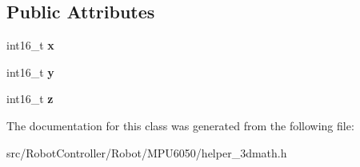 \subsection*{Public Attributes}
\begin{DoxyCompactItemize}
\item 
\hypertarget{class_vector_int16_a648435b4c99e9da9c95549ac344beaec}{int16\+\_\+t {\bfseries x}}\label{class_vector_int16_a648435b4c99e9da9c95549ac344beaec}

\item 
\hypertarget{class_vector_int16_a5d340e1f1bcbc064e5084ca609a6a6a3}{int16\+\_\+t {\bfseries y}}\label{class_vector_int16_a5d340e1f1bcbc064e5084ca609a6a6a3}

\item 
\hypertarget{class_vector_int16_af1b5c4c297bdd32751ab4519480b919f}{int16\+\_\+t {\bfseries z}}\label{class_vector_int16_af1b5c4c297bdd32751ab4519480b919f}

\end{DoxyCompactItemize}


The documentation for this class was generated from the following file\+:\begin{DoxyCompactItemize}
\item 
src/\+Robot\+Controller/\+Robot/\+M\+P\+U6050/helper\+\_\+3dmath.\+h\end{DoxyCompactItemize}
